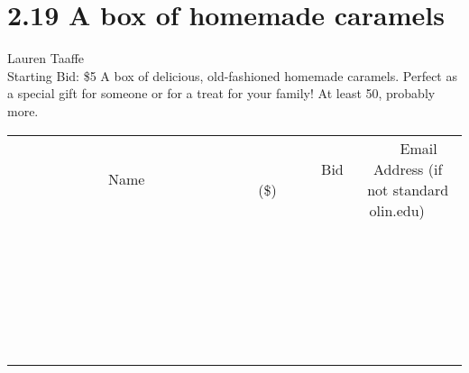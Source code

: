 \documentclass[11pt]{article}
\begin{document}
\section*{2.19 A box of homemade caramels}
Lauren Taaffe
\\
Starting Bid: \$5
\newline
A box of delicious, old-fashioned homemade caramels. Perfect as a special gift for someone or for a treat for your family! At least 50, probably more.
\\[6ex]
\begin{tabular}{c c c}
~~~~~~~~~~~~~Name~~~~~~~~~~~~~ & ~~~~~~~~~Bid (\$)~~~~~~~~~  & ~~~Email Address (if not standard olin.edu)~~~\\
 & & \\
\hline
 & & \\
\hline
 & & \\
\hline
 & & \\
\hline
 & & \\
\hline
 & & \\
\hline
 & & \\
\hline
 & & \\
\hline
 & & \\
\hline
 & & \\
\hline
 & & \\
\hline
 & & \\
\hline
 & & \\
\hline
 & & \\
\hline
 & & \\
\hline
 & & \\
\hline
 & & \\
\hline
 & & \\
\hline
 & & \\
\hline
 & & \\
\hline
 & & \\
\hline
 & & \\
\hline
 & & \\
\hline
 & & \\
\hline
 & & \\
\hline
 & & \\
\hline
\end{tabular}
\newpage
\end{document}
